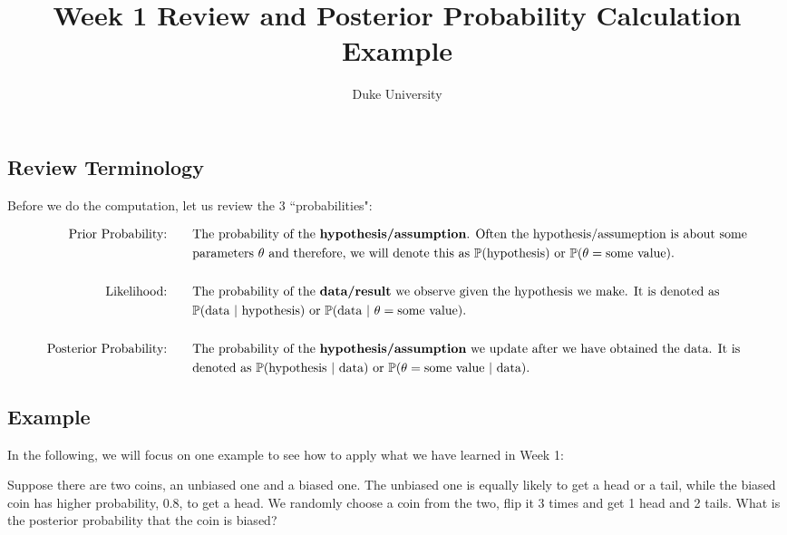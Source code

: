 \documentclass{article}
\begin{document}
\title{Week 1 Review and Posterior Probability Calculation Example}
\author{Duke University}
\date{}
\maketitle 

\subsection*{Review Terminology}

Before we do the computation, let us review the 3 ``probabilities":

\begin{align*}
\text{Prior Probability:} & \qquad \text{The probability of the \textbf{hypothesis/assumption}. Often the hypothesis/assumeption is about some}\\
& \qquad \text{parameters $\theta$ and therefore, we will denote this as }\mathbb{P}(\text{hypothesis})\text{ or }\mathbb{P}(\theta = \text{some value}).\\
& \\
\text{Likelihood:}  & \qquad \text{The probability of the \textbf{data/result} we observe given the hypothesis we make. It is denoted as }\\
& \qquad \mathbb{P}(\text{data}~|~\text{hypothesis}) \text{ or }\mathbb{P}(\text{data}~|~\theta = \text{some value}).\\
& \\
\text{Posterior Probability:} & \qquad \text{The probability of the \textbf{hypothesis/assumption} we update after we have obtained the data. It is }\\
& \qquad\text{denoted as $\mathbb{P}(\text{hypothesis}~|~\text{data})$ or $\mathbb{P}(\theta = \text{some value}~|~\text{data})$}.
\end{align*}

\subsection*{Example}

In the following, we will focus on one example to see how to apply what we have learned in Week 1:
\begin{displayquote}
	Suppose there are two coins, an unbiased one and a biased one. The unbiased one is equally likely to get a head or a tail, while the biased coin has higher probability, 0.8, to get a head. We randomly choose a coin from the two, flip it 3 times and get 1 head and 2 tails. What is the posterior probability that the coin is biased?
\end{displayquote}
\end{document}
